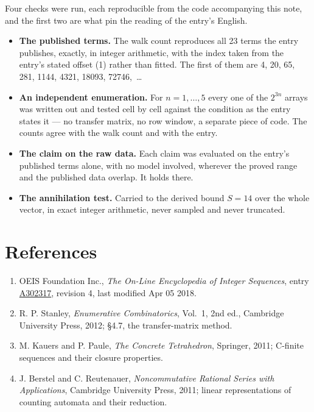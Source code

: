 \documentclass[11pt]{article}
\theoremstyle{definition}
\begin{document}
Four checks were run, each reproducible from the code accompanying this note, and the first two are what pin the reading of the entry's English.

\begin{itemize}

\item {\bfseries The published terms.} The walk count reproduces all 23 terms the entry publishes, exactly, in integer arithmetic, with the index taken from the entry's stated offset (1) rather than fitted. The first of them are 4, 20, 65, 281, 1144, 4321, 18093, 72746,~\dots

\item {\bfseries An independent enumeration.} For $n = 1,\dots,5$ every one of the $2^{3n}$ arrays was written out and tested cell by cell against the condition as the entry states it --- no transfer matrix, no row window, a separate piece of code. The counts agree with the walk count and with the entry.

\item {\bfseries The claim on the raw data.} Each claim was evaluated on the entry's published terms alone, with no model involved, wherever the proved range and the published data overlap. It holds there.

\item {\bfseries The annihilation test.} Carried to the derived bound $S = 14$ over the whole vector, in exact integer arithmetic, never sampled and never truncated.

\end{itemize}

\section{References}

\begin{enumerate}

\item OEIS Foundation Inc., \emph{The On-Line Encyclopedia of Integer Sequences}, entry \href{https://oeis.org/A302317}{A302317}, revision 4, last modified Apr 05 2018.

\item R. P. Stanley, \emph{Enumerative Combinatorics}, Vol.~1, 2nd ed., Cambridge University Press, 2012; \S4.7, the transfer-matrix method.

\item M. Kauers and P. Paule, \emph{The Concrete Tetrahedron}, Springer, 2011; C-finite sequences and their closure properties.

\item J. Berstel and C. Reutenauer, \emph{Noncommutative Rational Series with Applications}, Cambridge University Press, 2011; linear representations of counting automata and their reduction.

\end{enumerate}
\end{document}
